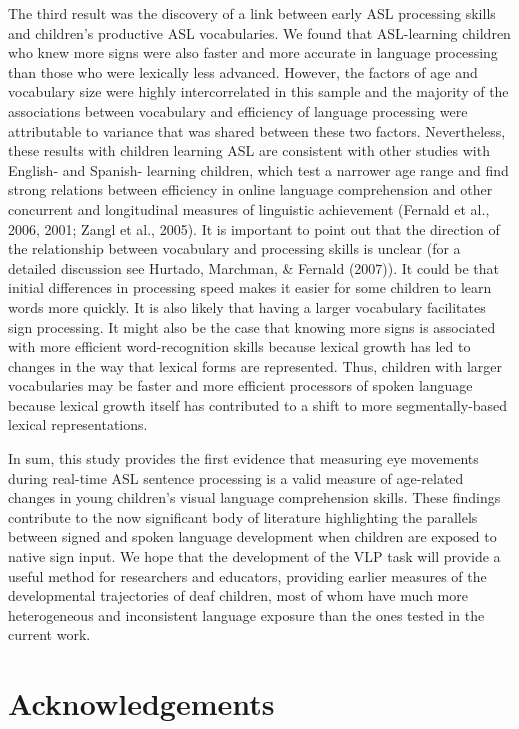 \documentclass[12pt,]{article}
\begin{document}
The third result was the discovery of a link between early ASL
processing skills and children's productive ASL vocabularies. We found
that ASL-learning children who knew more signs were also faster and more
accurate in language processing than those who were lexically less
advanced. However, the factors of age and vocabulary size were highly
intercorrelated in this sample and the majority of the associations
between vocabulary and efficiency of language processing were
attributable to variance that was shared between these two factors.
Nevertheless, these results with children learning ASL are consistent
with other studies with English- and Spanish- learning children, which
test a narrower age range and find strong relations between efficiency
in online language comprehension and other concurrent and longitudinal
measures of linguistic achievement (Fernald et al., 2006, 2001; Zangl et
al., 2005). It is important to point out that the direction of the
relationship between vocabulary and processing skills is unclear (for a
detailed discussion see Hurtado, Marchman, \& Fernald (2007)). It could
be that initial differences in processing speed makes it easier for some
children to learn words more quickly. It is also likely that having a
larger vocabulary facilitates sign processing. It might also be the case
that knowing more signs is associated with more efficient
word-recognition skills because lexical growth has led to changes in the
way that lexical forms are represented. Thus, children with larger
vocabularies may be faster and more efficient processors of spoken
language because lexical growth itself has contributed to a shift to
more segmentally-based lexical representations.

In sum, this study provides the first evidence that measuring eye
movements during real-time ASL sentence processing is a valid measure of
age-related changes in young children's visual language comprehension
skills. These findings contribute to the now significant body of
literature highlighting the parallels between signed and spoken language
development when children are exposed to native sign input. We hope that
the development of the VLP task will provide a useful method for
researchers and educators, providing earlier measures of the
developmental trajectories of deaf children, most of whom have much more
heterogeneous and inconsistent language exposure than the ones tested in
the current work.

\section{Acknowledgements}\label{acknowledgements}
\end{document}
